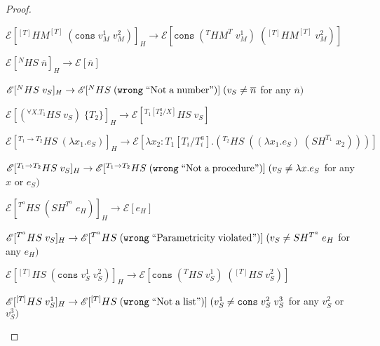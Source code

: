 \begin{hpn}
\begin{proof}
\begin{hpn-case-12}
\end{hpn-case-12}
\begin{hpn-case-13}
$\mathscr{E}[^{[T]}HM^{[T]}\;(\mathtt{cons}\;v_{M}^{1}\;v_{M}^{2})]_{H}\rightarrow\mathscr{E}[\mathtt{cons}\;(^{T}HM^{T}\;v_{M}^{1})\;(^{[T]}HM^{[T]}\;v_{M}^{2})]$

\end{hpn-case-13}
\begin{hpn-case-14}
$\mathscr{E}[^{N}HS\;\overline{n}]_{H}\rightarrow\mathscr{E}[\overline{n}]$

\end{hpn-case-14}
\begin{hpn-case-15}
$\mathscr{E}[^{N}HS\;v_{S}]_{H}\rightarrow\mathscr{E}[^{N}HS\;(\mathtt{wrong}\;\mathrm{``Not\;a\;number"})]\;(v_{S}\neq\overline{n}$ for any $\overline{n})$

\end{hpn-case-15}
\begin{hpn-case-16}
$\mathscr{E}[(^{\forall X.T_{1}}HS\;v_{S})\;\lbrace T_{2}\rbrace]_{H}\rightarrow\mathscr{E}[^{T_{1}[T^{a}_{2}/X]}HS\;v_{S}]$

\end{hpn-case-16}
\begin{hpn-case-17}
$\mathscr{E}[^{T_{1}\rightarrow T_{2}}HS\;(\lambda x_{1}.e_{S})]_{H}\rightarrow\mathscr{E}[\lambda x_{2}:T_{1}[T_{i}/T^{a}_{i}].(^{T_{2}}HS\;((\lambda x_{1}.e_{S})\;(SH^{T_{1}}\;x_{2})))]$

\end{hpn-case-17}
\begin{hpn-case-18}
$\mathscr{E}[^{T_{1}\rightarrow T_{2}}HS\;v_{S}]_{H}\rightarrow\mathscr{E}[^{T_{1}\rightarrow T_{2}}HS\;(\mathtt{wrong}\;\mathrm{``Not\;a\;procedure"})]\;(v_{S}\neq\lambda x.e_{S}$ for any $x$ or $e_{S})$

\end{hpn-case-18}
\begin{hpn-case-19}
$\mathscr{E}[^{T^{a}}HS\;(SH^{T^{a}}\;e_{H})]_{H}\rightarrow\mathscr{E}[e_{H}]$

\end{hpn-case-19}
\begin{hpn-case-20}
$\mathscr{E}[^{T^{a}}HS\;v_{S}]_{H}\rightarrow\mathscr{E}[^{T^{a}}HS\;(\mathtt{wrong}\;\mathrm{``Parametricity\;violated"})]\;(v_{S}\neq SH^{T^{a}}\;e_{H}$ for any $e_{H})$

\end{hpn-case-20}
\begin{hpn-case-21}
$\mathscr{E}[^{[T]}HS\;(\mathtt{cons}\;v_{S}^{1}\;v_{S}^{2})]_{H}\rightarrow\mathscr{E}[\mathtt{cons}\;(^{T}HS\;v_{S}^{1})\;(^{[T]}HS\;v_{S}^{2})]$

\end{hpn-case-21}
\begin{hpn-case-22}
$\mathscr{E}[^{[T]}HS\;v_{S}^{1}]_{H}\rightarrow\mathscr{E}[^{[T]}HS\;(\mathtt{wrong}\;\mathrm{``Not\;a\;list"})]\;(v_{S}^{1}\neq\mathtt{cons}\;v_{S}^{2}\;v_{S}^{3}$ for any $v_{S}^{2}$ or $v_{S}^{3})$

\end{hpn-case-22}
\end{proof}
\end{hpn}